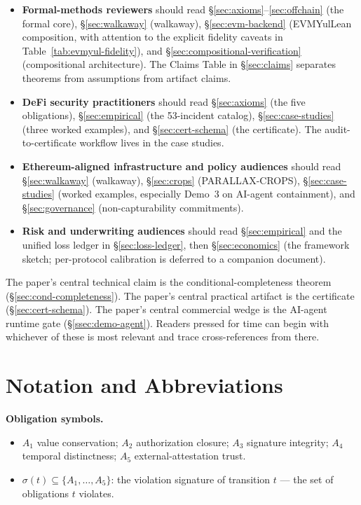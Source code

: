 \documentclass[11pt,a4paper]{article}
\begin{document}
\begin{itemize}\itemsep0.2em
  \item \textbf{Formal-methods reviewers} should read \S\ref{sec:axioms}--\ref{sec:offchain} (the formal core), \S\ref{sec:walkaway} (walkaway), \S\ref{sec:evm-backend} (EVMYulLean composition, with attention to the explicit fidelity caveats in Table~\ref{tab:evmyul-fidelity}), and \S\ref{sec:compositional-verification} (compositional architecture). The Claims Table in \S\ref{sec:claims} separates theorems from assumptions from artifact claims.
  \item \textbf{DeFi security practitioners} should read \S\ref{sec:axioms} (the five obligations), \S\ref{sec:empirical} (the 53-incident catalog), \S\ref{sec:case-studies} (three worked examples), and \S\ref{sec:cert-schema} (the certificate). The audit-to-certificate workflow lives in the case studies.
  \item \textbf{Ethereum-aligned infrastructure and policy audiences} should read \S\ref{sec:walkaway} (walkaway), \S\ref{sec:crops} (PARALLAX-CROPS), \S\ref{sec:case-studies} (worked examples, especially Demo~3 on AI-agent containment), and \S\ref{sec:governance} (non-capturability commitments).
  \item \textbf{Risk and underwriting audiences} should read \S\ref{sec:empirical} and the unified loss ledger in \S\ref{sec:loss-ledger}, then \S\ref{sec:economics} (the framework sketch; per-protocol calibration is deferred to a companion document).
\end{itemize}

\noindent The paper's central technical claim is the conditional-completeness theorem (\S\ref{sec:cond-completeness}). The paper's central practical artifact is the certificate (\S\ref{sec:cert-schema}). The paper's central commercial wedge is the AI-agent runtime gate (\S\ref{ssec:demo-agent}). Readers pressed for time can begin with whichever of these is most relevant and trace cross-references from there.

\section*{Notation and Abbreviations}

\noindent\textbf{Obligation symbols.}
\begin{itemize}\itemsep0em
  \item $A_1$ value conservation; $A_2$ authorization closure; $A_3$ signature integrity; $A_4$ temporal distinctness; $A_5$ external-attestation trust.
  \item $\sigma(t) \subseteq \{A_1,\dots,A_5\}$: the violation signature of transition $t$ --- the set of obligations $t$ violates.
\end{itemize}
\end{document}
